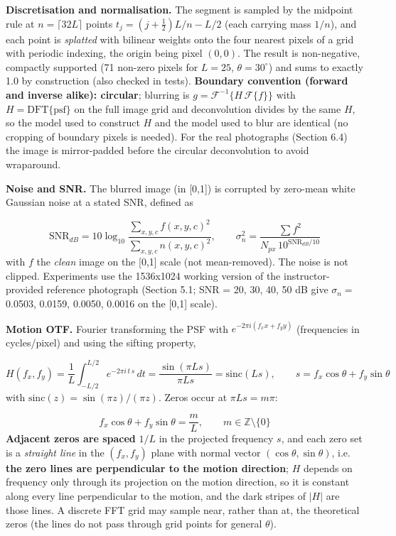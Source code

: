 \documentclass[10pt,a4paper]{article}
\begin{document}
\textbf{Discretisation and normalisation.} The segment is sampled by the midpoint rule at $n=\lceil32L\rceil$ points $t_j=(j+\tfrac12)L/n-L/2$ (each carrying mass $1/n$), and each point is \textit{splatted} with bilinear weights onto the four nearest pixels of a grid with periodic indexing, the origin being pixel $(0,0)$. The result is non-negative, compactly supported (71 non-zero pixels for $L=25$, $\theta=30^\circ$) and sums to exactly 1.0 by construction (also checked in tests). \textbf{Boundary convention (forward and inverse alike): circular}; blurring is $g=\mathcal F^{-1}\{H\,\mathcal F\{f\}\}$ with $H=\mathrm{DFT}\{\text{psf}\}$ on the full image grid and deconvolution divides by the same $H$, so the model used to construct $H$ and the model used to blur are identical (no cropping of boundary pixels is needed). For the real photographs (Section 6.4) the image is mirror-padded before the circular deconvolution to avoid wraparound.

\textbf{Noise and SNR.} The blurred image (in [0,1]) is corrupted by zero-mean white Gaussian noise at a stated SNR, defined as

\begin{equation}\mathrm{SNR}_{dB}=10\log_{10}\frac{\sum_{x,y,c}f(x,y,c)^{2}}{\sum_{x,y,c}n(x,y,c)^{2}},\qquad \sigma_n^{2}=\frac{\sum f^{2}}{N_{px}\,10^{\mathrm{SNR}_{dB}/10}}\end{equation}
with $f$ the \textit{clean} image on the [0,1] scale (not mean-removed). The noise is not clipped. Experiments use the 1536x1024 working version of the instructor-provided reference photograph (Section 5.1; SNR = 20, 30, 40, 50 dB give $\sigma_n=$ 0.0503, 0.0159, 0.0050, 0.0016 on the [0,1] scale).

\textbf{Motion OTF.} Fourier transforming the PSF with $e^{-2\pi i(f_xx+f_yy)}$ (frequencies in cycles/pixel) and using the sifting property,

\begin{equation}H(f_x,f_y)=\frac1L\int_{-L/2}^{L/2}e^{-2\pi i\,t\,s}\,dt=\frac{\sin(\pi L s)}{\pi L s}=\mathrm{sinc}(L s),\qquad s=f_x\cos\theta+f_y\sin\theta\end{equation}
with $\mathrm{sinc}(z)=\sin(\pi z)/(\pi z)$. Zeros occur at $\pi Ls=m\pi$:

\begin{equation}f_x\cos\theta+f_y\sin\theta=\frac{m}{L},\qquad m\in\mathbb Z\setminus\{0\}\end{equation}
\textbf{Adjacent zeros are spaced }$1/L$ in the projected frequency $s$, and each zero set is a \textit{straight line} in the $(f_x,f_y)$ plane with normal vector $(\cos\theta,\sin\theta)$, i.e. \textbf{the zero lines are perpendicular to the motion direction}; $H$ depends on frequency only through its projection on the motion direction, so it is constant along every line perpendicular to the motion, and the dark stripes of $|H|$ are those lines. A discrete FFT grid may sample near, rather than at, the theoretical zeros (the lines do not pass through grid points for general $\theta$).
\end{document}
